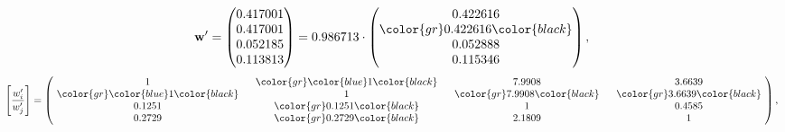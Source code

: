 \begin{example}
\begin{equation*}
\mathbf{w}^{\prime} =
\begin{pmatrix}
0.417001\\
0.417001\\
0.052185\\
0.113813
\end{pmatrix} =
0.986713\cdot
\begin{pmatrix}
0.422616\\
\color{gr} 0.422616\color{black} \\
0.052888\\
0.115346
\end{pmatrix},
\end{equation*}
\begin{equation*}
\left[ \frac{{w}^{\prime}_i}{{w}^{\prime}_j} \right] =
\begin{pmatrix}
$\,\,$ 1 $\,\,$ & $\,\,$\color{gr} \color{blue} 1\color{black} $\,\,$ & $\,\,$7.9908$\,\,$ & $\,\,$3.6639$\,\,$ \\
$\,\,$\color{gr} \color{blue} 1\color{black} $\,\,$ & $\,\,$ 1 $\,\,$ & $\,\,$\color{gr} 7.9908\color{black} $\,\,$ & $\,\,$\color{gr} 3.6639\color{black}   $\,\,$ \\
$\,\,$0.1251$\,\,$ & $\,\,$\color{gr} 0.1251\color{black} $\,\,$ & $\,\,$ 1 $\,\,$ & $\,\,$0.4585 $\,\,$ \\
$\,\,$0.2729$\,\,$ & $\,\,$\color{gr} 0.2729\color{black} $\,\,$ & $\,\,$2.1809$\,\,$ & $\,\,$ 1  $\,\,$ \\
\end{pmatrix},
\end{equation*}
\end{example}
\newpage
